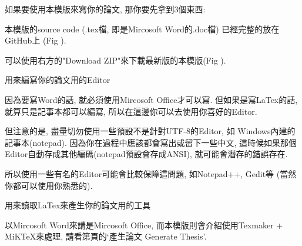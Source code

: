
如果要使用本模版來寫你的論文, 那你要先拿到3個東西:


本模版的source code (.tex檔, 即是Mircosoft Word的.doc檔) 已經完整的放在GitHub上 (Fig ).


可以使用右方的"Download ZIP"來下載最新版的本模版(Fig ).


用來編寫你的論文用的Editor

因為要寫Word的話, 就必須使用Mircosoft Office才可以寫. 但如果是寫LaTex的話, 就算只是記事本都可以編寫, 所以在這邊你可以去使用你喜好的Editor.

但注意的是, 盡量切勿使用一些預設不是針對UTF-8的Editor, 如 Windows內建的記事本(notepad). 因為你在過程中應該都會寫出或留下一些中文, 這時候如果那個Editor自動存成其他編碼(notepad預設會存成ANSI), 就可能會潛存的錯誤存在.

所以使用一些有名的Editor可能會比較保障這問題, 如Notepad++, Gedit等 (當然你都可以使用你熟悉的).



用來讀取LaTex來產生你的論文用的工具

以Mircosoft Word來講是Mircosoft Office, 而本模版則會介紹使用Texmaker + MiKTeX來處理, 請看第頁的`產生論文 Generate Thesis'.

